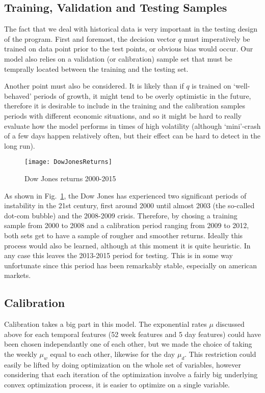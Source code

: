 \documentclass[11pt,fleqn]{article}
\newcommand{\figref}[1]{Fig.~\ref{#1}}
\begin{document}
\subsection{Training, Validation and Testing Samples}

The fact that we deal with historical data is very important in the testing design of the
program. First and foremost, the decision vector $q$ must imperatively be trained on data
point prior to the test points, or obvious bias would occur. Our model also relies on a
validation (or calibration) sample set that must be temprally located between the training
and the testing set.

Another point must also be considered. It is likely than if $q$ is trained on
`well-behaved' periods of growth, it might tend to be overly optimistic in the future,
therefore it is desirable to include in the training and the calibration samples periods
with different economic situations, and so it might be hard to really evaluate how the
model performs in times of high volatility (although `mini'-crash of a few days happen
relatively often, but their effect can be hard to detect in the long run).

\begin{figure}
  \centering
  \texttt{[image: DowJonesReturns]}
  \caption{Dow Jones returns 2000-2015}
  \label{fig:dowjonesreturns}
\end{figure}

As shown in \figref{fig:dowjonesreturns}, the Dow Jones has experienced two significant
periods of instability in the 21st century, first around 2000 until almost 2003 (the
so-called dot-com bubble) and the 2008-2009 crisis. Therefore, by chosing a training
sample from 2000 to 2008 and a calibration period ranging from 2009 to 2012, both sets get
to have a sample of rougher and smoother returns. Ideally this process would also be
learned, although at this moment it is quite heuristic. In any case this leaves the
2013-2015 period for testing. This is in some way unfortunate since this period has been
remarkably stable, especially on american markets.


\subsection{Calibration}

Calibration takes a big part in this model. The exponential rates $\mu$ discussed above
for each temporal features (52 week features and 5 day features) could have been chosen
independantly one of each other, but we made the choice of taking the weekly $\mu_w$ equal
to each other, likewise for the day $\mu_d$. This restriction could easily be lifted by
doing optimization on the whole set of variables, however considering that each iteration
of the optimization involve a fairly big underlying convex optimization process, it is
easier to optimize on a single variable.
\end{document}
